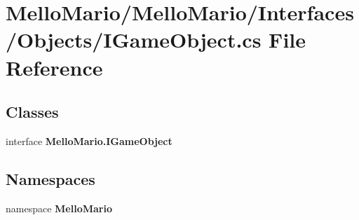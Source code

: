 \section{Mello\+Mario/\+Mello\+Mario/\+Interfaces/\+Objects/\+I\+Game\+Object.cs File Reference}
\label{IGameObject_8cs}
\subsection*{Classes}
\begin{DoxyCompactItemize}
\item 
interface \textbf{ Mello\+Mario.\+I\+Game\+Object}
\end{DoxyCompactItemize}
\subsection*{Namespaces}
\begin{DoxyCompactItemize}
\item 
namespace \textbf{ Mello\+Mario}
\end{DoxyCompactItemize}
